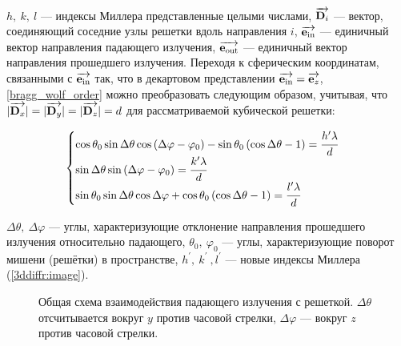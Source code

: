  $h,\:k,\:l$ --- индексы Миллера представленные целыми числами, $\overrightarrow{\textbf{D}_{i}}$ --- вектор, соединяющий соседние узлы решетки вдоль направления $i$, $\overrightarrow{\textbf{e}_{\textrm{in}}}$ --- единичный вектор направления падающего излучения, $\overrightarrow{\textbf{e}_{\textrm{out}}}$ --- единичный вектор направления прошедшего излучения. Переходя к сферическим координатам, связанными с $\overrightarrow{\textbf{e}_{\textrm{in}}}$ так, что в декартовом представлении $\overrightarrow{\textbf{e}_{\textrm{in}}} = \overrightarrow{\textbf{e}_{z}}$, \autoref{bragg_wolf_order} можно преобразовать следующим образом, учитывая, что $|\overrightarrow{\textbf{D}_{x}}| = |\overrightarrow{\textbf{D}_{y}}| = |\overrightarrow{\textbf{D}_{z}}| = d$ для рассматриваемой кубической решетки:

    \begin{equation}
        \begin{cases}
            \cos{\theta_0}\sin{\Delta \theta}\cos{\left( \Delta \varphi - \varphi_0 \right)} - \sin{\theta_0} \left( \cos{\Delta \theta} - 1 \right) = \cfrac{h^{\prime} \lambda}{d}
            \\
            \sin{\Delta \theta} \sin{\left( \Delta \varphi - \varphi_0 \right)} = \cfrac{k^{\prime} \lambda}{d}
            \\
            \sin{\theta_0}\sin{\Delta \theta}\cos{\Delta \varphi} + \cos{\theta_0} \left( \cos{\Delta \theta} - 1 \right)= \cfrac{l^{\prime} \lambda}{d}
        \end{cases}
        \label{bragg_wolf_order_spherical}
    \end{equation}

 $\Delta \theta,\:\Delta \varphi$ --- углы, характеризующие отклонение направления прошедшего излучения относительно падающего, $\theta_0,\:\varphi_0$ --- углы, характеризующие поворот мишени (решётки) в пространстве, $h^\prime,\:k^\prime\:,l^\prime$ --- новые индексы Миллера (\autoref{3ddiffr:image}).

    \begin{figure}[ht]
        \hfil
        \caption{Общая схема взаимодействия падающего излучения с решеткой. $\Delta \theta$ отсчитывается вокруг $y$ против часовой стрелки, $\Delta \varphi$ --- вокруг $z$ против часовой стрелки.}\label{3ddiffr:image}
    \end{figure}


